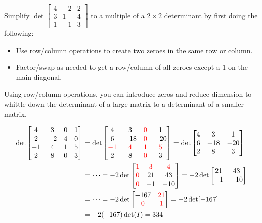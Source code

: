 \begin{activity}{5}
  Simplify
  \(\det \begin{bmatrix} 4 & -2 & 2 \\ 3 & 1 & 4 \\ 1 & -1 & 3\end{bmatrix}\)
  to a multiple of a \(2\times 2\) determinant by first doing the following:
  \begin{itemize}
    \item Use row/column operations to create two zeroes in the same row or column.
    \item Factor/swap as needed to get a row/column of all zeroes except 
      a \(1\) on the main diagonal.
  \end{itemize}
\end{activity}


\begin{observation}
Using row/column operations, you can introduce zeros
and reduce dimension to whittle down the determinant of a large
matrix to a determinant of a smaller matrix.

\begin{align*}
    \det\begin{bmatrix} 
      4 & 3 & 0 & 1 \\ 
      2 & -2 & 4 & 0 \\ 
      -1 & 4 & 1 & 5 \\ 
      2 & 8 & 0 & 3 
    \end{bmatrix}
  &=
    \det\begin{bmatrix} 
      4 & 3 & \textcolor{red}{0} & 1 \\ 
      6 & -18 & \textcolor{red}{0} & -20 \\ 
      \textcolor{red}{-1} & \textcolor{red}{4} & 
        \textcolor{red}{1} & \textcolor{red}{5} \\ 
      2 & 8 & \textcolor{red}{0} & 3 
    \end{bmatrix}
  =
    \det\begin{bmatrix} 
      4 & 3 & 1 \\ 
      6 & -18 & -20 \\ 
      2 & 8 & 3 
    \end{bmatrix}
  \\&=\dots=
    -2\det\begin{bmatrix}
      \textcolor{red}{1} & \textcolor{red}{3} & \textcolor{red}{4} \\ 
      \textcolor{red}{0} & 21 & 43 \\ 
      \textcolor{red}{0} & -1 & -10 
    \end{bmatrix}
  =
    -2\det\begin{bmatrix} 21 & 43 \\ -1 & -10 \end{bmatrix}
  \\&= \dots=
    -2\det\begin{bmatrix}
      -167 & \textcolor{red}{21} \\
      \textcolor{red}{0} & \textcolor{red}{1}
    \end{bmatrix}
   = -2\det[-167]
  \\&=-2(-167)\det(I)=
    334
\end{align*} 
\end{observation}

